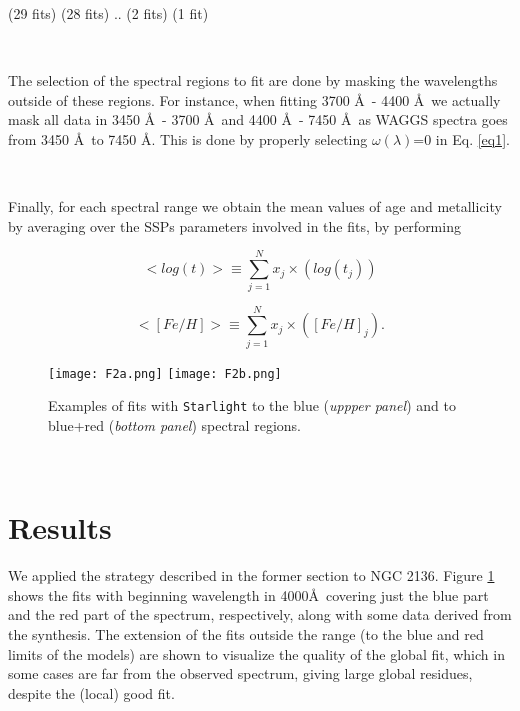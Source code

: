 \documentclass[baaa]{baaa}
\begin{document}
(29 fits)	  \hspace{0.5cm}	(28  fits)  \hspace{0.5cm}  ..	\hspace{0.5cm}    (2 fits)      \hspace{0.5cm}	(1 fit)

\

The selection of the spectral regions to fit are done by masking the wavelengths outside of these regions. For instance, when fitting 3700 \AA\ - 4400 \AA\ we actually mask all data in 3450 \AA\ - 3700 \AA\ and 4400 \AA\ - 7450 \AA\, as WAGGS spectra goes from 3450 \AA\ to 7450 \AA . This is done by properly selecting $\omega(\lambda)$=0 in Eq. \ref{eq1}.

\

Finally, for each spectral range we obtain the mean values of age and metallicity by averaging over the SSPs parameters involved in the fits, by performing

\begin{equation}
\label{eq2}
<log (t)> \equiv \sum_{j=1}^{N} x_j \times (log (t_j))
\end{equation}

\begin{equation}
\label{eq3}
<[Fe/H]> \equiv \sum_{j=1}^{N} x_j \times ([Fe/H]_j).
\end{equation}

\begin{figure}[!ht]
\centering
\texttt{[image: F2a.png]}
\texttt{[image: F2b.png]}
\caption{Examples of fits with {\tt Starlight} to the blue (\emph {uppper panel}) and to blue+red (\emph{bottom panel}) spectral regions.}
\label{Blue}
\end{figure}

\

\section{Results}

We applied the strategy described in the former section to NGC 2136. Figure \ref{Blue} shows the fits with beginning wavelength in 4000\AA\ covering just the blue part and the red part of the spectrum, respectively, along with some data derived from the synthesis. The extension of the fits outside the range (to the blue and red limits of the models) are shown to visualize the quality of the global fit, which in some cases are far from the observed spectrum, giving large global residues, despite the (local) good fit.
\end{document}
